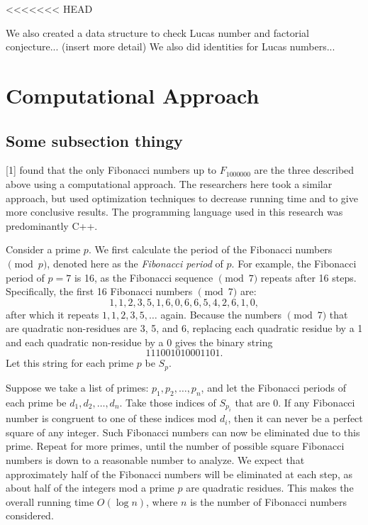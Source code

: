 \documentclass[11pt]{article}
\begin{document}



<<<<<<< HEAD

We also created a data structure to check Lucas number and factorial conjecture... (insert more detail) We also did identities for Lucas numbers...

\section{Computational Approach}

\subsection{Some subsection thingy}

[1] found that the only Fibonacci numbers up to $F_{1000000}$ are the three described above using a computational approach. The researchers here took a similar approach, but used optimization techniques to decrease running time and to give more conclusive results. The programming language used in this research was predominantly C++.


Consider a prime $p$. We first calculate the period of the Fibonacci numbers $\pmod p$, denoted here as the \textit{Fibonacci period} of $p$. For example, the Fibonacci period of $p = 7$ is 16, as the Fibonacci sequence $\pmod 7$ repeats after 16 steps. Specifically, the first 16 Fibonacci numbers $\pmod{7}$ are: \[ 1, 1, 2, 3, 5, 1, 6, 0, 6, 6, 5, 4, 2, 6, 1, 0, \] after which it repeats $1, 1, 2, 3, 5, \dots$ again. Because the numbers $\pmod{7}$ that are quadratic non-residues are 3, 5, and 6, replacing each quadratic residue by a 1 and each quadratic non-residue by a 0 gives the binary string \[111001010001101.\] Let this string for each prime $p$ be $S_p$. 

Suppose we take a list of primes: $p_1, p_2, \dots , p_n$, and let the Fibonacci periods of each prime be $d_1, d_2, \dots , d_n$. Take those indices of $S_{p_i}$ that are 0. If any Fibonacci number is congruent to one of these indices mod $d_i$, then it can never be a perfect square of any integer. Such Fibonacci numbers can now be eliminated due to this prime. Repeat for more primes, until the number of possible square Fibonacci numbers is down to a reasonable number to analyze. We expect that approximately half of the Fibonacci numbers will be eliminated at each step, as about half of the integers mod a prime $p$ are quadratic residues. This makes the overall running time $O(\log n)$, where $n$ is the number of Fibonacci numbers considered.
\end{document}
